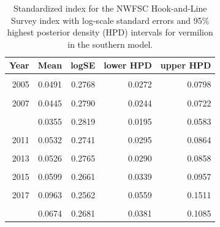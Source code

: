 \documentclass[11pt,
  english,
]{article}
\begin{document}
\begin{table}

\caption{\label{tab:tab-index-nwfschl}Standardized index for the NWFSC Hook-and-Line Survey index with log-scale standard errors and 95\% highest
       posterior density (HPD) intervals for vermilion in the southern model.}
\centering
\begin{tabular}[t]{rrrrr}
\toprule
Year & Mean & logSE & lower HPD & upper HPD\\
\midrule
\cellcolor{gray!6}{2004} & \cellcolor{gray!6}{0.0403} & \cellcolor{gray!6}{0.2824} & \cellcolor{gray!6}{0.0222} & \cellcolor{gray!6}{0.0666}\\
2005 & 0.0491 & 0.2768 & 0.0272 & 0.0798\\
\cellcolor{gray!6}{2006} & \cellcolor{gray!6}{0.0438} & \cellcolor{gray!6}{0.2817} & \cellcolor{gray!6}{0.0239} & \cellcolor{gray!6}{0.0719}\\
2007 & 0.0445 & 0.2790 & 0.0244 & 0.0722\\
\cellcolor{gray!6}{2008} & \cellcolor{gray!6}{0.0266} & \cellcolor{gray!6}{0.2843} & \cellcolor{gray!6}{0.0145} & \cellcolor{gray!6}{0.0444}\\
\addlinespace
2009 & 0.0355 & 0.2819 & 0.0195 & 0.0583\\
\cellcolor{gray!6}{2010} & \cellcolor{gray!6}{0.0361} & \cellcolor{gray!6}{0.2825} & \cellcolor{gray!6}{0.0197} & \cellcolor{gray!6}{0.0599}\\
2011 & 0.0532 & 0.2741 & 0.0295 & 0.0864\\
\cellcolor{gray!6}{2012} & \cellcolor{gray!6}{0.0454} & \cellcolor{gray!6}{0.2756} & \cellcolor{gray!6}{0.0254} & \cellcolor{gray!6}{0.0739}\\
2013 & 0.0526 & 0.2765 & 0.0290 & 0.0858\\
\addlinespace
\cellcolor{gray!6}{2014} & \cellcolor{gray!6}{0.0578} & \cellcolor{gray!6}{0.2697} & \cellcolor{gray!6}{0.0326} & \cellcolor{gray!6}{0.0931}\\
2015 & 0.0599 & 0.2661 & 0.0339 & 0.0957\\
\cellcolor{gray!6}{2016} & \cellcolor{gray!6}{0.0586} & \cellcolor{gray!6}{0.2697} & \cellcolor{gray!6}{0.0329} & \cellcolor{gray!6}{0.0950}\\
2017 & 0.0963 & 0.2562 & 0.0559 & 0.1511\\
\cellcolor{gray!6}{2018} & \cellcolor{gray!6}{0.0879} & \cellcolor{gray!6}{0.2606} & \cellcolor{gray!6}{0.0501} & \cellcolor{gray!6}{0.1392}\\
\addlinespace
2019 & 0.0674 & 0.2681 & 0.0381 & 0.1085\\
\bottomrule
\end{tabular}
\end{table}
\end{document}

